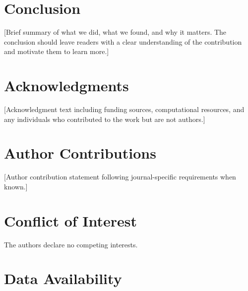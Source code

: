 \documentclass[11pt,a4paper]{article}
\begin{document}
\section{Conclusion}

[Brief summary of what we did, what we found, and why it matters. The conclusion should leave readers with a clear understanding of the contribution and motivate them to learn more.]


\section*{Acknowledgments}

[Acknowledgment text including funding sources, computational resources, and any individuals who contributed to the work but are not authors.]


\section*{Author Contributions}

[Author contribution statement following journal-specific requirements when known.]


\section*{Conflict of Interest}

The authors declare no competing interests.


\section*{Data Availability}
\end{document}
